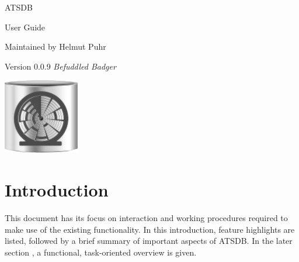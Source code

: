 \documentclass[10pt,letterpaper,extrafontsizes]{memoir}
\begin{document}
\firmlists
\midsloppy
\raggedbottom
{}




\frontmatter
\pagestyle{empty}


\vspace*{\fill}
\begin{center}
\HUGE\textsf{ATSDB}\par
\end{center}

\begin{center}
\Huge\textsf{User Guide}\par
\end{center}
\begin{center}
\normalsize\textsf{Maintained by Helmut Puhr}\par
\medskip
\normalsize\textsf{Version 0.0.9 \textit{Befuddled Badger}}\par
\end{center}
\vspace*{\fill}
\begin{center}
\includegraphics[width=\droptitle]{../logo/atsdb.png}
\setlength{\droptitle}{0pt}%
\end{center}
\clearpage

\cleardoublepage

\pagestyle{headings}

\setupshorttoc
\tableofcontents
\clearpage
\setupparasubsecs
\setupmaintoc
\tableofcontents
\setlength{\unitlength}{1pt}
\clearpage
\listoffigures
\clearpage
\listoftables


\chapter{Introduction}

This document has its focus on interaction and working procedures required to make use of the existing
functionality. In this introduction, feature highlights are listed, followed by a brief summary of important aspects of  ATSDB. In the later section , a functional, task-oriented overview is given. 
\end{document}
